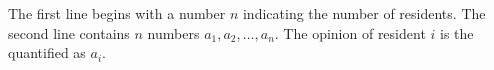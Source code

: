 The first line begins with a number $n$ indicating the number of residents.
The second line contains $n$ numbers $a_1, a_2, \dots, a_n$. 
The opinion of resident $i$ is the quantified as $a_i$.

